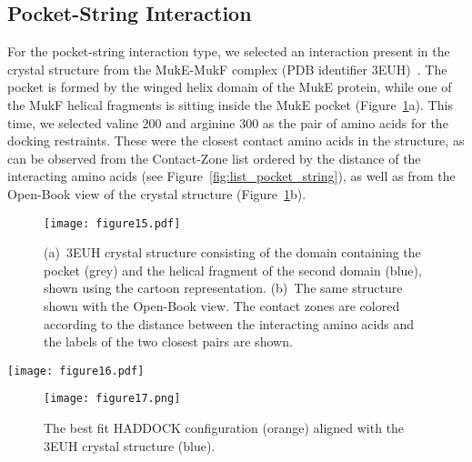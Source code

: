 \documentclass[twocolumn]{bmcart}%
\def\OpBook {Open-Book view\xspace}
\def\CoZoList{Contact-Zone list\xspace}
\def\CoZoLists{Contact-Zone lists\xspace}
\begin{document}
\subsection*{Pocket-String Interaction}
For the pocket-string interaction type, we selected an interaction present in the crystal structure from the MukE-MukF complex (PDB identifier 3EUH)~\cite{Woo}. 
The pocket is formed by the winged helix domain of the MukE protein, while one of the MukF helical fragments is sitting inside the MukE pocket (Figure~\ref{fig:MukEF_crystal_3EUH_selected}a). 
This time, we selected valine 200 and arginine 300 as the pair of amino acids for the docking restraints. 
These were the closest contact amino acids in the structure, as can be observed from the \CoZoList ordered by the distance of the interacting amino acids (see Figure~\ref{fig:list_pocket_string}), as well as from the \OpBook of the crystal structure (Figure~\ref{fig:MukEF_crystal_3EUH_selected}b). 

\begin{figure}[b!]
    \centering
    \texttt{[image: figure15.pdf]}
    \vspace{-5pt}
    \caption{ (a)~3EUH crystal structure consisting of the domain containing the pocket (grey) and the helical fragment of the second domain (blue), shown using the cartoon representation. (b)~The same structure shown with the \OpBook. The contact zones are colored according to the distance between the interacting amino acids and the labels of the two closest pairs are shown.}
  \label{fig:MukEF_crystal_3EUH_selected}
\end{figure}

\begin{figure*}[tb]
    \centering
    \texttt{[image: figure16.pdf]}
    \caption{ \CoZoLists of the selected HADDOCK configurations sorted according to the distance of the amino acids. (a) The primary 3EUH crystal structure, (b), (c), (d) three selected HADDOCK models. The sorting shows that the V200-R300 pair is one of the closest ones in the crystal as well as in all selected models.}
  \label{fig:list_pocket_string}
\end{figure*}

\begin{figure}[h!]
  \centering
  \texttt{[image: figure17.png]}
  \caption{ The best fit HADDOCK configuration (orange) aligned with the 3EUH crystal structure (blue).}
  \label{fig:MukEF_selection_3_best_pair}
\end{figure}
\end{document}
